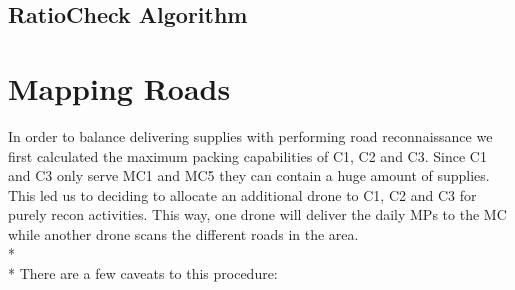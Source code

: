 \documentclass[a4paper,12pt]{article}
\begin{document}
\subsection{RatioCheck Algorithm}

\newpage

\section{Mapping Roads}
In order to balance delivering supplies with performing road reconnaissance we first calculated the maximum packing capabilities of C1, C2 and C3.
Since C1 and C3 only serve MC1 and MC5 they can contain a huge amount of supplies. This led us to deciding to allocate an additional drone to C1, C2 and C3 for purely recon activities.
This way, one drone will deliver the daily MPs to the MC while another drone scans the different roads in the area.\\*\\*
There are a few caveats to this procedure:
\end{document}
